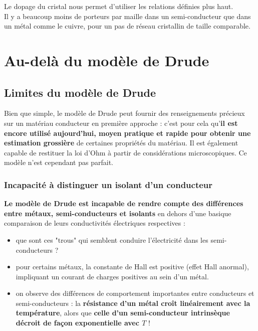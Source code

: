 \documentclass[11pt,a4paper]{report}
\begin{document}
Le dopage du cristal nous permet d'utiliser les relations définies plus haut.\\

Il y a beaucoup moins de porteurs par maille dans un semi-conducteur que dans un métal comme le cuivre, pour un pas de réseau cristallin de taille comparable.

\newpage
\section{Au-delà du modèle de Drude}

\subsection{Limites du modèle de Drude}

Bien que simple, le modèle de Drude peut fournir des renseignements précieux sur un matériau conducteur en première approche : c'est pour cela qu'\textbf{il est encore utilisé aujourd'hui, moyen pratique et rapide pour obtenir une estimation grossière} de certaines propriétés du matériau. Il est également capable de restituer la loi d'Ohm à partir de considérations microscopiques. Ce modèle n'est cependant pas parfait.\\

\subsubsection{Incapacité à distinguer un isolant d'un conducteur}

\textbf{Le modèle de Drude est incapable de rendre compte des différences entre métaux, semi-conducteurs et isolants} en dehors d'une basique comparaison de leurs conductivités électriques respectives :
\begin{itemize}
	\item que sont ces "trous" qui semblent conduire l'électricité dans les semi-conducteurs ?
	\item pour certains métaux, la constante de Hall est positive (effet Hall anormal), impliquant un courant de charges positives au sein d'un métal.
	\item on observe des différences de comportement importantes entre conducteurs et semi-conducteurs : la \textbf{résistance d'un métal croît linéairement avec la température}, alors que \textbf{celle d'un semi-conducteur intrinsèque décroit de façon exponentielle avec $T$} !\\
\end{itemize}
\end{document}
